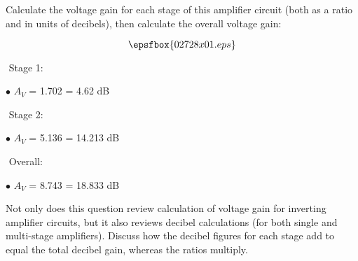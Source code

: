 

Calculate the voltage gain for each stage of this amplifier circuit (both as a ratio and in units of decibels), then calculate the overall voltage gain:

$$\epsfbox{02728x01.eps}$$







\medskip
\goodbreak
\item{$ $} Stage 1:
\item{$\bullet$} $A_V$ = 1.702 = 4.62 dB
\medskip

\medskip
\goodbreak
\item{$ $} Stage 2:
\item{$\bullet$} $A_V$ = 5.136 = 14.213 dB
\medskip

\medskip
\goodbreak
\item{$ $} Overall:
\item{$\bullet$} $A_V$ = 8.743 = 18.833 dB
\medskip







Not only does this question review calculation of voltage gain for inverting amplifier circuits, but it also reviews decibel calculations (for both single and multi-stage amplifiers).  Discuss how the decibel figures for each stage add to equal the total decibel gain, whereas the ratios multiply.




